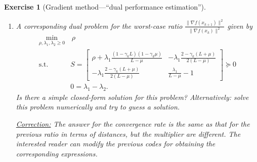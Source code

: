 \documentclass[11pt,a4paper]{article}
\newcommand{\correction}[1]{{{\color{blue}\underline{Correction:} #1}}}
\newcommand{\correction}[1]{}
\newtheorem{exercise}{Exercise}
\begin{document}
\begin{exercise}[Gradient method---``dual performance estimation'']
\begin{enumerate}
	
	
	
	
	\item A corresponding dual problem for the worst-case ratio $\frac{\|\nabla f(x_{k+1})\|^2}{\|\nabla f(x_k)\|^2}$ given by
	\begin{equation}\label{eq:ex1_dual2}	 
		\begin{aligned}
			\min_{\rho,\lambda_1,\lambda_2\geqslant 0} & \,\rho\\
			\text{s.t. }& S=\begin{bmatrix}
		\rho+\lambda_1 \frac{(1-\gamma_k L)(1-\gamma_k \mu)}{L-\mu} & -\lambda_1\frac{2-\gamma_k(L+\mu)}{2(L-\mu)}\\
		-\lambda_1\frac{2-\gamma_k(L+\mu)}{2(L-\mu)} & \frac{\lambda_1}{L-\mu}-1
			\end{bmatrix}\succcurlyeq 0\\
			&0=\lambda_1-\lambda_2.
		\end{aligned}
		\end{equation} Is there a simple closed-form solution for this problem? Alternatively: solve this problem numerically and try to guess a solution.
		
	\correction{The answer for the convergence rate is the same as that for the previous ratio in terms of distances, but the multiplier are different. The interested reader can modify the previous codes for obtaining the corresponding expressions.}
	

\end{enumerate}
\end{exercise}
\end{document}
